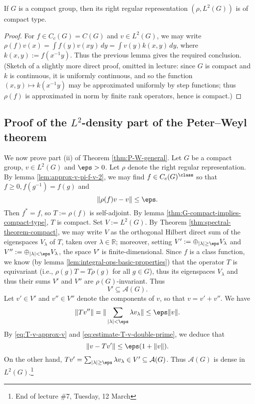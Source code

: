 \documentclass[reqno]{amsart} 
\begin{document}
\begin{lemma}\label{thm:G-compact-implies-compact-type}
  If $G$ is a compact group, then its right regular representation $(\rho,L^2(G))$ is of compact type.
\end{lemma}
\begin{proof}
  For $f \in C_c(G) = C(G)$ and $v \in L^2(G)$, we may write $\rho(f) v(x) = \int f(y) v(x y) \, d y = \int v(y) k(x,y) \, d y$, where $k(x,y) := f(x^{-1} y)$.  Thus the previous lemma gives the required conclusion.  (Sketch of a slightly more direct proof, omitted in lecture: since $G$ is compact and $k$ is continuous, it is uniformly continuous, and so the function $(x,y) \mapsto k(x^{-1} y)$ may be approximated uniformly by step functions; thus $\rho(f)$ is approximated in norm by finite rank operators, hence is compact.)
\end{proof}

\subsection{Proof of the \texorpdfstring{$L^2$}{L2}-density
  part of the Peter--Weyl theorem}
We now prove part (ii) of Theorem \ref{thm:P-W-general}.  Let $G$ be a compact group, $v \in L^2(G)$ and $\eps > 0$.  Let $\rho$ denote the right regular representation.  By lemma \ref{lem:approx-v-pi-f-v-2}, we may find $f \in C_c(G)^{\class}$ so that $f \geq 0, f(g^{-1}) = f(g)$ and
\begin{equation}\label{eq:T-v-approx-v}
  \|\rho(f) v - v\| \leq \eps.
\end{equation}
Then $f^* = f$, so $T := \rho(f)$ is self-adjoint.  By lemma \ref{thm:G-compact-implies-compact-type}, $T$ is compact.  Set $V := L^2(G)$.  By Theorem \ref{thm:spectral-theorem-compact}, we may write $V$ as the orthogonal Hilbert direct sum of the eigenspaces $V_\lambda$ of $T$, taken over $\lambda \in \mathbb{R}$; moreover, setting $V' := \oplus_{|\lambda| \geq \eps} V_\lambda$ and $V'' := \oplus_{|\lambda| < \eps} V_\lambda$, the space $V'$ is finite-dimensional.  Since $f$ is a class function, we know (by lemma \ref{lem:integral-ops-basic-properties}) that the operator $T$ is equivariant (i.e., $\rho(g) T = T \rho(g)$ for all $g \in G$), thus its eigenspaces $V_\lambda$ and thus their sums $V'$ and $V''$ are $\rho(G)$-invariant.  Thus
\begin{equation}\label{eq:V'-finite}
  V' \subseteq \mathcal{A}(G).
\end{equation}
Let $v' \in V'$ and $v'' \in V''$ denote the components of $v$, so that $v = v' + v''$.  We have
\begin{equation}\label{eq:estimate-T-v-double-prime}
  \|T v''\|
  = \|\sum_{|\lambda| < \eps } \lambda v_\lambda \|
  \leq \eps \|v\|.
\end{equation}
By \eqref{eq:T-v-approx-v} and \eqref{eq:estimate-T-v-double-prime}, we deduce that
\begin{equation*}
  \|v - T v'\| \leq \eps (1 + \|v\|).
\end{equation*}
On the other hand, $T v' = \sum_{|\lambda| \geq \eps} \lambda v_\lambda \in V' \subseteq \mathcal{A}(G)$.  Thus $\mathcal{A}(G)$ is dense in $L^2(G)$.\footnote{End of lecture \#7, Tuesday, 12 March}
\end{document}
